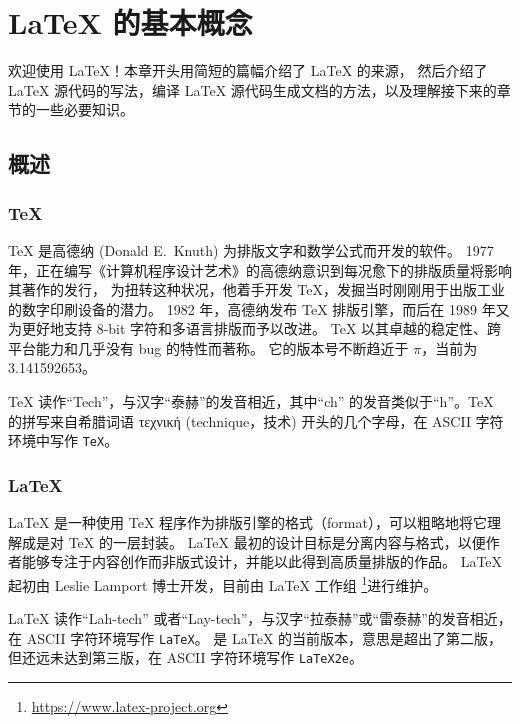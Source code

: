 \chapter{\LaTeX{} 的基本概念}\label{chap:basics}

\begin{intro}
欢迎使用 \LaTeX{}！本章开头用简短的篇幅介绍了 \LaTeX{} 的来源，
然后介绍了 \LaTeX{} 源代码的写法，编译 \LaTeX{} 源代码生成文档的方法，以及理解接下来的章节的一些必要知识。
\end{intro}

\section{概述}\label{sec:intro}

\subsection{\protect\TeX}\label{subsec:tex}

\TeX{} 是高德纳 (Donald E.~Knuth) 为排版文字和数学公式而开发的软件\cite{texbook}。
1977 年，正在编写《计算机程序设计艺术》的高德纳意识到每况愈下的排版质量将影响其著作的发行，
为扭转这种状况，他着手开发 \TeX{}，发掘当时刚刚用于出版工业的数字印刷设备的潜力。
1982 年，高德纳发布 \TeX{} 排版引擎，而后在 1989 年又为更好地支持 8-bit 字符和多语言排版而予以改进。
\TeX{} 以其卓越的稳定性、跨平台能力和几乎没有 bug 的特性而著称。
它的版本号不断趋近于 $\pi$，当前为 3.141592653。

\TeX{} 读作“Tech”，与汉字“泰赫”的发音相近，其中“ch” 的发音类似于“h”。\TeX{} 的拼写来自希腊词语
τεχνική (technique，技术) 开头的几个字母，在 ASCII 字符环境中写作 \texttt{TeX}。

\subsection{\LaTeX}\label{subsec:latex}

\LaTeX{} 是一种使用 \TeX{} 程序作为排版引擎的格式（format），可以粗略地将它理解成是对 \TeX{} 的一层封装。
\LaTeX{} 最初的设计目标是分离内容与格式，以便作者能够专注于内容创作而非版式设计，并能以此得到高质量排版的作品。
\LaTeX{} 起初由 Leslie Lamport 博士\cite{manual}开发，目前由 \LaTeX{} 工作组%
\footnote{\url{https://www.latex-project.org}}进行维护。

\LaTeX{} 读作“Lah-tech” 或者“Lay-tech”，与汉字“拉泰赫”或“雷泰赫”的发音相近，在 ASCII 字符环境写作 \texttt{LaTeX}。
\LaTeXe{} 是 \LaTeX{} 的当前版本，意思是超出了第二版，但还远未达到第三版，在 ASCII 字符环境写作 \texttt{LaTeX2e}。

